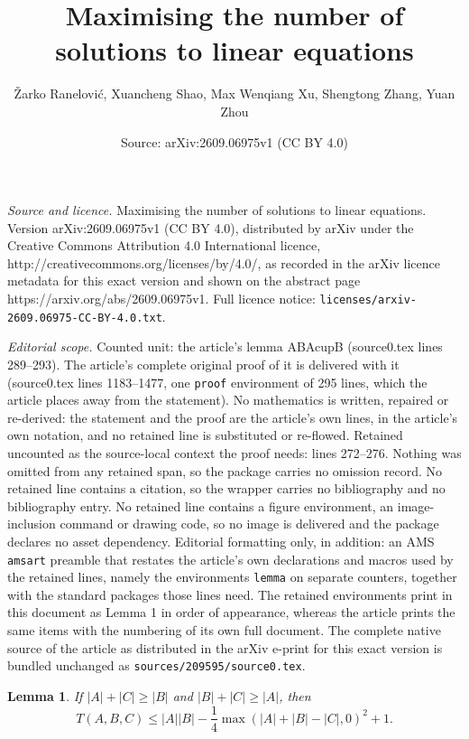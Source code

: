 \documentclass[10pt,a4paper]{amsart}
\title{Maximising the number of solutions to linear equations}
\author{\v{Z}arko Ran\dj elovi\'c, Xuancheng Shao, Max Wenqiang Xu, Shengtong Zhang, Yuan Zhou}
\date{Source: arXiv:2609.06975v1 (CC BY 4.0)}
\newtheorem{lemma}{Lemma}
\begin{document}
\maketitle

\noindent\emph{Source and licence.} Maximising the number of solutions to linear equations. Version arXiv:2609.06975v1 (CC BY 4.0), distributed by arXiv under the Creative Commons Attribution 4.0 International licence, http://creativecommons.org/licenses/by/4.0/, as recorded in the arXiv licence metadata for this exact version and shown on the abstract page https://arxiv.org/abs/2609.06975v1. Full licence notice: \texttt{licenses/arxiv-2609.06975-CC-BY-4.0.txt}.\par\smallskip

\noindent\textit{Editorial scope.} Counted unit: the article's lemma ABAcupB (source0.tex lines 289--293). The article's complete original proof of it is delivered with it (source0.tex lines 1183--1477, one \texttt{proof} environment of 295 lines, which the article places away from the statement). No mathematics is written, repaired or re-derived: the statement and the proof are the article's own lines, in the article's own notation, and no retained line is substituted or re-flowed.  Retained uncounted as the source-local context the proof needs: lines 272--276.  Nothing was omitted from any retained span, so the package carries no omission record.  No retained line contains a citation, so the wrapper carries no bibliography and no bibliography entry.  No retained line contains a figure environment, an image-inclusion command or drawing code, so no image is delivered and the package declares no asset dependency.  Editorial formatting only, in addition: an AMS \texttt{amsart} preamble that restates the article's own declarations and macros used by the retained lines, namely the environments \texttt{lemma} on separate counters, together with the standard packages those lines need.  The retained environments print in this document as Lemma 1 in order of appearance, whereas the article prints the same items with the numbering of its own full document.  The complete native source of the article as distributed in the arXiv e-print for this exact version is bundled unchanged as \texttt{sources/209595/source0.tex}.
\begin{lemma}
    If $|A| + |C| \geq |B|$ and $|B| + |C| \geq |A|$, then
    \label{lemma ABC}
    $$T(A, B, C) \leq |A||B| - \frac{1}{4} \max(|A| + |B| - |C|, 0)^2 + 1.$$
\end{lemma}
\end{document}

